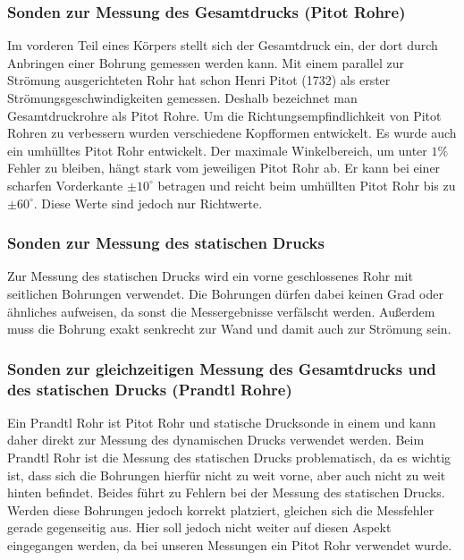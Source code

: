 \subsubsection{Sonden zur Messung des Gesamtdrucks (Pitot Rohre)}
Im vorderen Teil eines Körpers stellt sich der Gesamtdruck ein, der dort durch Anbringen einer Bohrung gemessen werden kann. Mit einem parallel zur Strömung ausgerichteten Rohr hat schon Henri Pitot (1732) als erster Strömungsgeschwindigkeiten gemessen. Deshalb bezeichnet man Gesamtdruckrohre als Pitot Rohre. Um die Richtungsempfindlichkeit von Pitot Rohren zu verbessern wurden verschiedene Kopfformen entwickelt. Es wurde auch ein umhülltes Pitot Rohr entwickelt. Der maximale Winkelbereich, um unter $ 1 \% $ Fehler zu bleiben, hängt stark vom jeweiligen Pitot Rohr ab. Er kann bei einer scharfen Vorderkante $ \pm 10^{\circ} $ betragen und reicht beim umhüllten Pitot Rohr bis zu $ \pm 60^{\circ} $. Diese Werte sind jedoch nur Richtwerte.

\subsubsection{Sonden zur Messung des statischen Drucks}
Zur Messung des statischen Drucks wird ein vorne geschlossenes Rohr mit seitlichen Bohrungen verwendet. Die Bohrungen dürfen dabei keinen Grad oder ähnliches aufweisen, da sonst die Messergebnisse verfälscht werden. Außerdem muss die Bohrung exakt senkrecht zur Wand und damit auch zur Strömung sein.

\subsubsection{Sonden zur gleichzeitigen Messung des Gesamtdrucks und des statischen Drucks (Prandtl Rohre)}
Ein Prandtl Rohr ist Pitot Rohr und statische Drucksonde in einem und kann daher direkt zur Messung des dynamischen Drucks verwendet werden. Beim Prandtl Rohr ist die Messung des statischen Drucks problematisch, da es wichtig ist, dass sich die Bohrungen hierfür nicht zu weit vorne, aber auch nicht zu weit hinten befindet. Beides führt zu Fehlern bei der Messung des statischen Drucks. Werden diese Bohrungen jedoch korrekt platziert, gleichen sich die Messfehler gerade gegenseitig aus. Hier soll jedoch nicht weiter auf diesen Aspekt eingegangen werden, da bei unseren Messungen ein Pitot Rohr verwendet wurde.
